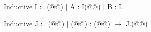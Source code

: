 Inductive I :=(@\vspace{-0.04cm}@)
| A : I(@\vspace{-0.04cm}@)
| B : I.

Inductive J :=(@\vspace{-0.04cm}@)
| (@@) : (@@) $\rightarrow$ J.(@\vspace{-0.04cm}@)
$\phantom{hi}$

